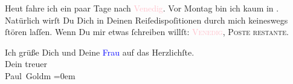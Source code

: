 \pstart
           Heut fahre ich ein paar Tage nach \textcolor{pink}{Venedig}{}\ledrightnote{\textcolor{pink}{Venedig}}. Vor Montag bin ich kaum
               in \label{K_L03386-3v}\label{K_L03386-3h}. Natürlich wirſt Du Dich in
               Deinen Reiſedispoſitionen durch mich keineswegs ſtören laſſen. Wenn Du mir etwas
               ſchreiben willſt: \textsc{\textcolor{pink}{Venedig}{}\ledrightnote{\textcolor{pink}{Venedig}}, Poste restante}.\pend
           
\pstart
           Ich grüße Dich und Deine \textcolor{blue}{Frau}{}\ledrightnote{{$\rightarrow$}\textcolor{blue}{Olga Schnitzler}} auf das Herzlichſte. {\\[\baselineskip]}Dein treuer {\\[\baselineskip]}\spacefill\mbox{Paul Goldm}\pend
           \leftskip=0em{}\endnumbering{}
\begin{anhang}
\end{anhang}
      